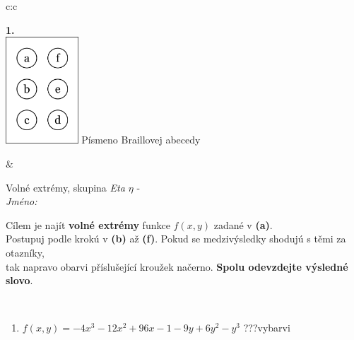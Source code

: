 \documentclass[10pt]{report}
\begin{document}
\begin{tabular}{c:c}
\begin{minipage}[c][104.5mm][t]{0.5\linewidth}
\begin{center}
\begin{minipage}{0.79\linewidth}
\begin{center}
\begin{varwidth}{\linewidth}
\begin{enumerate}
\end{enumerate}
\end{varwidth}
\end{center}
\end{minipage}
\begin{minipage}{0.20\linewidth}
\begin{center}
{\Huge\bfseries 1.} \\[2mm]
\includegraphics[height=40mm]{../images/braille.png}
{\small Písmeno Braillovej abecedy}
\end{center}
\end{minipage}
\end{center}
\end{minipage}
&
\begin{minipage}[c][104.5mm][t]{0.5\linewidth}
\begin{center}
\vspace{7mm}
{\huge Volné extrémy, skupina \textit{Eta $\eta$} -}\\[5mm]
\textit{Jméno:}\phantom{xxxxxxxxxxxxxxxxxxxxxxxxxxxxxxxxxxxxxxxxxxxxxxxxxxxxxxxxxxxxxxxxx}\\[5mm]
\begin{minipage}{0.95\linewidth}
\begin{center}
Cílem je najít \textbf{volné extrémy} funkce $f(x,y)$ zadané v \textbf{(a)}.\\Postupuj podle krokú v \textbf{(b)} až \textbf{(f)}. Pokud se medzivýsledky shodujú s těmi za otazníky,\\tak napravo obarvi příslušející kroužek načerno. \textbf{Spolu odevzdejte výsledné slovo}.
\end{center}
\end{minipage}
\\[1mm]
\begin{minipage}{0.79\linewidth}
\begin{center}
\begin{varwidth}{\linewidth}
\begin{enumerate}
\normalsize
\item $f(x,y)=-4x^3-12x^2+96x-1-9y+6y^2-y^3$\quad \dotfill\; ???\;\dotfill \quad vybarvi

\end{enumerate}
\end{varwidth}
\end{center}
\end{minipage}
\end{center}
\end{minipage}
\end{tabular}
\end{document}
